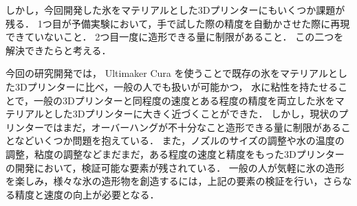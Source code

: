 しかし，今回開発した氷をマテリアルとした3Dプリンターにもいくつか課題が残る．
1つ目が予備実験において，手で試した際の精度を自動かさせた際に再現できていないこと．
2つ目一度に造形できる量に制限があること．
この二つを解決できたらと考える．

今回の研究開発では， Ultimaker Cura を使うことで既存の氷をマテリアルとした3Dプリンターに比べ，一般の人でも扱いが可能かつ，
水に粘性を持たせることで，一般の3Dプリンターと同程度の速度とある程度の精度を両立した氷をマテリアルとした3Dプリンターに大きく近づくことができた．
しかし，現状のプリンターではまだ，オーバーハングが不十分なこと造形できる量に制限があることなどいくつか問題を抱えている．
また，ノズルのサイズの調整や水の温度の調整，粘度の調整などまだまだ，ある程度の速度と精度をもった3Dプリンターの開発において，検証可能な要素が残されている．
一般の人が気軽に氷の造形を楽しみ，様々な氷の造形物を創造するには，上記の要素の検証を行い，さらなる精度と速度の向上が必要となる．









